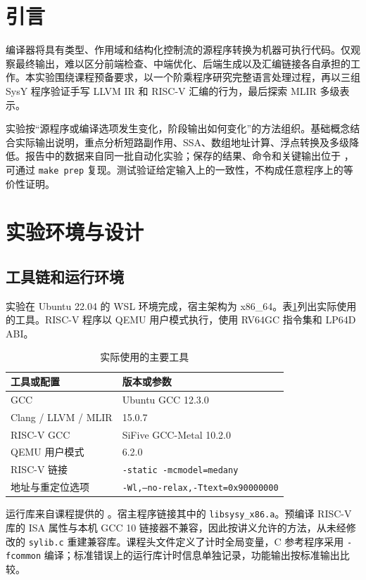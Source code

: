\documentclass[UTF8,a4paper,10pt,fontset=fandol]{ctexart}
\begin{document}
\section{引言}
编译器将具有类型、作用域和结构化控制流的源程序转换为机器可执行代码。仅观察最终输出，难以区分前端检查、中端优化、后端生成以及汇编链接各自承担的工作。本实验围绕课程预备要求\cite{assignment}，以一个阶乘程序研究完整语言处理过程，再以三组 SysY 程序验证手写 LLVM IR 和 RISC-V 汇编的行为，最后探索 MLIR 多级表示。

实验按“源程序或编译选项发生变化，阶段输出如何变化”的方法组织。基础概念结合实际输出说明，重点分析短路副作用、SSA、数组地址计算、浮点转换及多级降低。报告中的数据来自同一批自动化实验；保存的结果、命令和关键输出位于 ，可通过 \texttt{make prep} 复现。测试验证给定输入上的一致性，不构成任意程序上的等价性证明。

\section{实验环境与设计}
\subsection{工具链和运行环境}
实验在 Ubuntu 22.04 的 WSL 环境完成，宿主架构为 x86\_64。表\ref{tab:tools}列出实际使用的工具。RISC-V 程序以 QEMU 用户模式执行，使用 RV64GC 指令集和 LP64D ABI。
\begin{table}[H]
\centering\small
\caption{实际使用的主要工具}\label{tab:tools}
\begin{tabularx}{\textwidth}{lX}
\toprule
工具或配置 & 版本或参数\\
\midrule
GCC & Ubuntu GCC 12.3.0\\
Clang / LLVM / MLIR & 15.0.7\\
RISC-V GCC & SiFive GCC-Metal 10.2.0\\
QEMU 用户模式 & 6.2.0\\
RISC-V 链接 & \texttt{-static -mcmodel=medany}\\
地址与重定位选项 & \texttt{-Wl,--no-relax,-Ttext=0x90000000}\\
\bottomrule
\end{tabularx}
\end{table}

运行库来自课程提供的 \cite{runtime,guide}。宿主程序链接其中的 \texttt{libsysy\_x86.a}。预编译 RISC-V 库的 ISA 属性与本机 GCC 10 链接器不兼容，因此按讲义允许的方法，从未经修改的 \texttt{sylib.c} 重建兼容库。课程头文件定义了计时全局变量，C 参考程序采用 \texttt{-fcommon} 编译；标准错误上的运行库计时信息单独记录，功能输出按标准输出比较。
\end{document}
